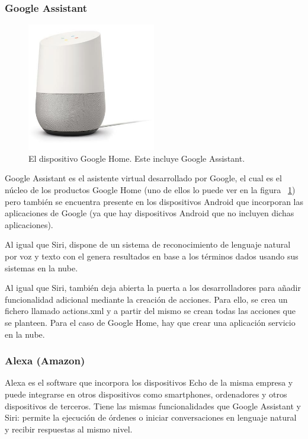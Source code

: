 \documentclass[spanish,12pt, a4paper, twoside]{paper}
\begin{document}
\subsubsection{Google Assistant}

\begin{figure}
\centering
	\includegraphics[width=0.5\textwidth]{recursos/homeG}
\caption{El dispositivo Google Home. Este incluye Google Assistant.}
\label{fig:Dispositivo Google Home}
\end{figure}

Google Assistant es el asistente virtual desarrollado por Google, el cual es el núcleo de los productos Google Home (uno de ellos lo puede ver en la figura ~\ref{fig:Dispositivo Google Home}) pero también se encuentra presente en los dispositivos Android que incorporan las aplicaciones de Google (ya que hay dispositivos Android que no incluyen dichas aplicaciones).
\newline

Al igual que Siri, dispone de un sistema de reconocimiento de lenguaje natural por voz y texto con el genera resultados en base a los términos dados usando sus sistemas en la nube.
\newline

Al igual que Siri, también deja abierta la puerta a los desarrolladores para añadir funcionalidad adicional mediante la creación de acciones. Para ello, se crea un fichero llamado actions.xml y a partir del mismo se crean todas las acciones que se planteen. Para el caso de Google Home, hay que crear una aplicación servicio en la nube.

\subsubsection{Alexa (Amazon)}

Alexa es el software que incorpora los dispositivos Echo de la misma empresa y puede integrarse en otros dispositivos como smartphones, ordenadores y otros dispositivos de terceros. Tiene las mismas funcionalidades que Google Assistant y Siri: permite la ejecución de órdenes o iniciar conversaciones en lenguaje natural y recibir respuestas al mismo nivel.
\newline
\end{document}
